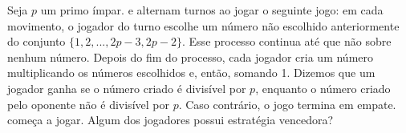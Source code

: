 Seja $p$ um primo ímpar.  e  alternam turnos ao jogar o seguinte jogo: em cada movimento, o jogador do turno escolhe um número não escolhido anteriormente do conjunto $\{1,2,...,2p-3,2p-2\}$. Esse processo continua até que não sobre nenhum número.
Depois do fim do processo, cada jogador cria um número multiplicando os números escolhidos e, então, somando 1.
Dizemos que um jogador ganha se o número criado é divisível por $p$, enquanto o número criado pelo oponente não é divisível por $p$. Caso contrário, o jogo termina em empate.  começa a jogar.
Algum dos jogadores possui estratégia vencedora?
